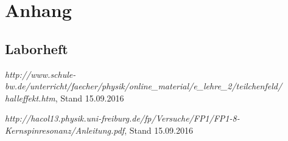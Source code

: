 \documentclass[12pt]{article}
\begin{document}
\newpage
\section{Anhang}


%


%

\newpage
\subsection{Laborheft}

\newpage
\listoffigures


\newpage
\thispagestyle{empty}
\begin{thebibliography}{9}

  

  
  
\emph{http://www.schule-bw.de/unterricht/faecher/physik/online\_material/e\_lehre\_2/teilchenfeld/\\halleffekt.htm}, Stand 15.09.2016

\emph{http://hacol13.physik.uni-freiburg.de/fp/Versuche/FP1/FP1-8-Kernspinresonanz/Anleitung.pdf}, Stand 15.09.2016
\end{thebibliography}
\end{document}
